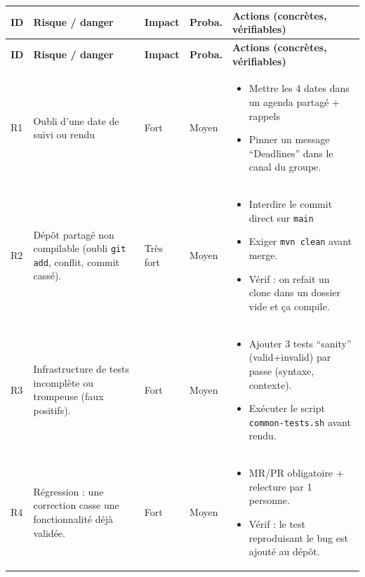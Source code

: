 \documentclass[11pt,a4paper]{article}
\begin{document}
\begin{longtable}{|p{1.4cm}|p{4.1cm}|p{1.6cm}|p{1.9cm}|p{6.2cm}|}
\hline
\textbf{ID} & \textbf{Risque / danger} & \textbf{Impact} & \textbf{Proba.} & \textbf{Actions (concrètes, vérifiables)} \\
\hline
\endfirsthead

\hline
\textbf{ID} & \textbf{Risque / danger} & \textbf{Impact} & \textbf{Proba.} & \textbf{Actions (concrètes, vérifiables)} \\
\hline
\endhead

\hline
\endfoot

\hline
\endlastfoot

R1 & Oubli d'une date de suivi ou rendu & Fort & Moyen &
\begin{itemize}[leftmargin=*, nosep]
\item Mettre les 4 dates dans un agenda partagé + rappels
\item Pinner un message ``Deadlines'' dans le canal du groupe.
\end{itemize}
\\ \hline

R2 & Dépôt partagé non compilable (oubli \texttt{git add}, conflit, commit cassé). & Très fort & Moyen &
\begin{itemize}[leftmargin=*, nosep]
\item Interdire le commit direct sur \texttt{main}
\item Exiger \texttt{mvn clean} avant merge.
\item Vérif : on refait un clone dans un dossier vide et ça compile.
\end{itemize}
\\ \hline

R3 & Infrastructure de tests incomplète ou trompeuse (faux positifs). & Fort & Moyen &
\begin{itemize}[leftmargin=*, nosep]
\item Ajouter 3 tests ``sanity'' (valid+invalid) par passe (syntaxe, contexte).
\item Exécuter le script \texttt{common-tests.sh} avant rendu.
\end{itemize}
\\ \hline

R4 & Régression : une correction casse une fonctionnalité déjà validée. & Fort & Moyen &
\begin{itemize}[leftmargin=*, nosep]
\item MR/PR obligatoire + relecture par 1 personne.
\item Vérif : le test reproduisant le bug est ajouté au dépôt.
\end{itemize}
\\ \hline


\end{longtable}
\end{document}
